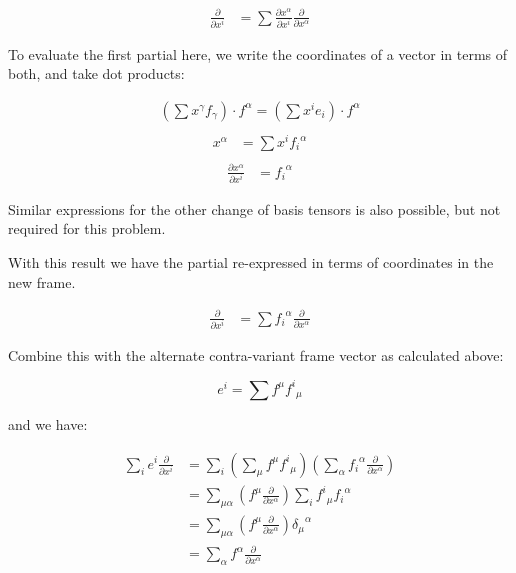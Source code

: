 \documentclass{article}      %
\begin{document}
\begin{align*}
\frac{\partial}{\partial x^i} &= \sum \frac{\partial x^\alpha}{\partial x^i} \frac{\partial}{\partial x^\alpha} 
\end{align*}

To evaluate the first partial here, we write the coordinates of a vector in terms of both, and take dot products:

\begin{align*}
\left(\sum x^{\gamma} f_{\gamma}\right) \cdot f^{\alpha} = \left(\sum x^i e_i\right) \cdot f^{\alpha} \\
\end{align*}
\begin{align*}
x^{\alpha} &= \sum x^i {f_i}^{\alpha} \\
\end{align*}
\begin{align*}
\frac{\partial x^{\alpha}}{\partial x^i} &= {f_i}^{\alpha}
\end{align*}

Similar expressions for the other change of basis tensors is also possible, but
not required for this problem.

With this result we have the partial re-expressed in terms of coordinates
in the new frame.

\begin{align*}
\frac{\partial}{\partial x^i} &= \sum {f_i}^{\alpha} \frac{\partial}{\partial x^\alpha} 
\end{align*}

Combine this with the alternate contra-variant frame vector as calculated above:

\[
e^i = \sum f^{\mu} {f^i}_{\mu}
\]

and we have:

\begin{align*}
\sum_i e^i \frac{\partial}{\partial x^i}
&= \sum_i \left(\sum_{\mu} f^{\mu} {f^i}_{\mu} \right) \left( \sum_{\alpha} {f_i}^{\alpha} \frac{\partial}{\partial x^\alpha}\right) \\
&= \sum_{\mu \alpha} \left(f^{\mu} \frac{\partial}{\partial x^\alpha} \right) \sum_i {f^i}_{\mu} {f_i}^{\alpha} \\
&= \sum_{\mu \alpha} \left(f^{\mu} \frac{\partial}{\partial x^\alpha} \right) {\delta_{\mu}}^{\alpha} \\
&= \sum_{\alpha} f^{\alpha} \frac{\partial}{\partial x^\alpha} \\
\end{align*}
\end{document}

